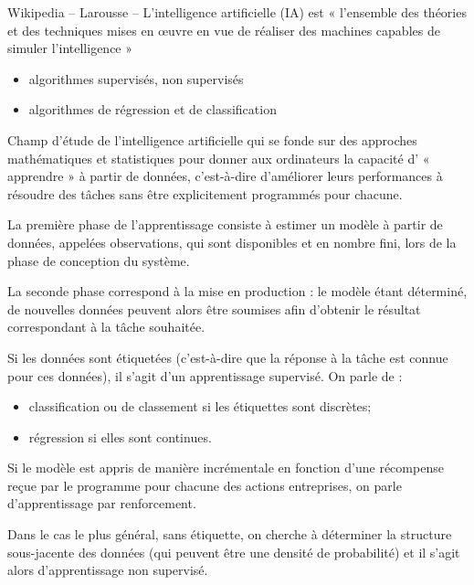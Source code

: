 \begin{defi}
Wikipedia -- Larousse -- L'intelligence artificielle (IA) est « l'ensemble des théories et des techniques mises en œuvre en vue de réaliser des machines capables de simuler l'intelligence »
\end{defi}

\begin{itemize}
\item algorithmes supervisés, non supervisés
\item algorithmes de régression et de classification
\end{itemize}

\begin{defi} 
Champ d'étude de l'intelligence artificielle qui se fonde sur des approches mathématiques et statistiques pour donner aux ordinateurs la capacité d' « apprendre » à partir de données, c'est-à-dire d'améliorer leurs performances à résoudre des tâches sans être explicitement programmés pour chacune. 

La première phase de l'apprentissage consiste à estimer un modèle à partir de données, appelées observations, qui sont disponibles et en nombre fini, lors de la phase de conception du système.

 La seconde phase correspond à la mise en production : le modèle étant déterminé, de nouvelles données peuvent alors être soumises afin d'obtenir le résultat correspondant à la tâche souhaitée.
\end{defi}


\begin{defi} 
Si les données sont étiquetées (c'est-à-dire que la réponse à la tâche est connue pour ces données), il s'agit d'un apprentissage supervisé. On parle de :
\begin{itemize}
\item classification ou de classement si les étiquettes sont discrètes;
\item régression si elles sont continues.
\end{itemize}

Si le modèle est appris de manière incrémentale en fonction d'une récompense reçue par le programme pour chacune des actions entreprises, on parle d'apprentissage par renforcement. 

Dans le cas le plus général, sans étiquette, on cherche à déterminer la structure sous-jacente des données (qui peuvent être une densité de probabilité) et il s'agit alors d'apprentissage non supervisé.



\end{defi}


